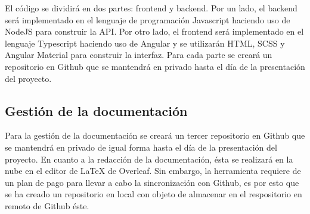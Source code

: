 El código se dividirá en dos partes: frontend y backend. Por un lado, el backend será implementado en el lenguaje de programación Javascript haciendo uso de NodeJS para construir la API. Por otro lado, el frontend será implementado en el lenguaje Typescript haciendo uso de Angular y se utilizarán HTML, SCSS y Angular Material para construir la interfaz. Para cada parte se creará un repositorio en Github que se mantendrá en privado hasta el día de la presentación del proyecto.

\subsection{Gestión de la documentación}
Para la gestión de la documentación se creará un tercer repositorio en Github que se mantendrá en privado de igual forma hasta el día de la presentación del proyecto. En cuanto a la redacción de la documentación, ésta se realizará en la nube en el editor de LaTeX de Overleaf. Sin embargo, la herramienta requiere de un plan de pago para llevar a cabo la sincronización con Github, es por esto que se ha creado un repositorio en local con objeto de almacenar en el respositorio en remoto de Github éste.


